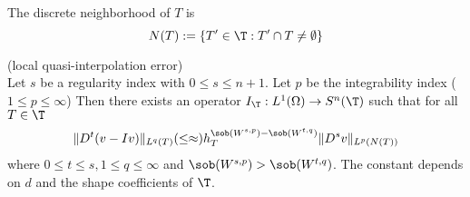 \begin{definition}
	The discrete neighborhood of $T$ is
	\begin{equation*}
		N(T):= \left\{ T' \in \T : T'\cap T \neq \emptyset \right\}
	\end{equation*}
\end{definition}
\begin{theorem}
	(local quasi-interpolation error)\\
	Let $s$ be a regularity index with $0 \leq s \leq n+1$.
	Let $p$ be the integrability index ($1 \leq p \leq \infty$)
	Then there exists an operator $I_{\T}: L^1(\Omega) \to S^n(\T)$ such that for all $T \in \T$ 
	\begin{equation*}
		\|D^t(v - Iv)\|_{L^{q}(T)} (\leq \approx) h_{T}^{\sob(W^{s,p})-\sob(W^{t,q})} \|D^s v\|_{L^{p}(N(T))}
	\end{equation*}
	where $0 \leq t \leq s, 1 \leq q\leq \infty$ and $\sob(W^{s,p}) > \sob(W^{t,q})$.
	The constant depends on $d$ and the shape coefficients of $\T$.
\end{theorem}
